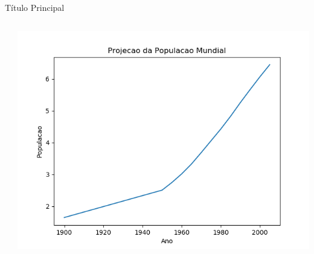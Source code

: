 \begin{frame}[t, fragile]{Título Principal}
  \begin{columns}
    \begin{column}{0.55\textwidth}
          
    \end{column}

    \begin{column}{0.45\textwidth}
      \begin{center}
        \includegraphics[scale=.35]{aula-2/figuras/matplotlib-customization-3.png}
      \end{center}
    \end{column}
  \end{columns}
\end{frame}
%
